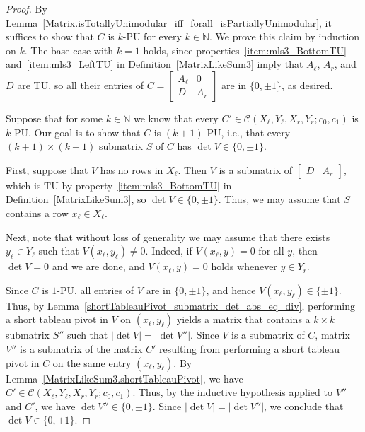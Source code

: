\begin{proof}
    \leanok
    By Lemma~\ref{Matrix.isTotallyUnimodular_iff_forall_isPartiallyUnimodular}, it suffices to show that $C$ is $k$-PU for every $k \in \mathbb{N}$. We prove this claim by induction on $k$. The base case with $k = 1$ holds, since properties~\ref{item:mls3_BottomTU} and~\ref{item:mls3_LeftTU} in Definition~\ref{MatrixLikeSum3} imply that $A_{\ell}$, $A_{r}$, and $D$ are TU, so all their entries of $C = \begin{bmatrix} A_{\ell} & 0 \\ D & A_{r} \end{bmatrix}$ are in $\{0, \pm 1\}$, as desired.

    Suppose that for some $k \in \mathbb{N}$ we know that every $C' \in \mathcal{C} (X_{\ell}, Y_{\ell}, X_{r}, Y_{r}; c_{0}, c_{1})$ is $k$-PU. Our goal is to show that $C$ is $(k + 1)$-PU, i.e., that every $(k + 1) \times (k + 1)$ submatrix $S$ of $C$ has $\det V \in \{0, \pm 1\}$.

    First, suppose that $V$ has no rows in $X_{\ell}$. Then $V$ is a submatrix of $\begin{bmatrix} D & A_{r} \end{bmatrix}$, which is TU by property~\ref{item:mls3_BottomTU} in Definition~\ref{MatrixLikeSum3}, so $\det V \in \{0, \pm 1\}$. Thus, we may assume that $S$ contains a row $x_{\ell} \in X_{\ell}$.

    Next, note that without loss of generality we may assume that there exists $y_{\ell} \in Y_{\ell}$ such that $V (x_{\ell}, y_{\ell}) \neq 0$. Indeed, if $V (x_{\ell}, y) = 0$ for all $y$, then $\det V = 0$ and we are done, and $V (x_{\ell}, y) = 0$ holds whenever $y \in Y_{r}$.

    Since $C$ is $1$-PU, all entries of $V$ are in $\{0, \pm 1\}$, and hence $V (x_{\ell}, y_{\ell}) \in \{\pm 1\}$. Thus, by Lemma~\ref{shortTableauPivot_submatrix_det_abs_eq_div}, performing a short tableau pivot in $V$ on $(x_{\ell}, y_{\ell})$ yields a matrix that contains a $k \times k$ submatrix $S''$ such that $|\det V| = |\det V''|$. Since $V$ is a submatrix of $C$, matrix $V''$ is a submatrix of the matrix $C'$ resulting from performing a short tableau pivot in $C$ on the same entry $(x_{\ell}, y_{\ell})$. By Lemma~\ref{MatrixLikeSum3.shortTableauPivot}, we have $C' \in \mathcal{C} (X_{\ell}, Y_{\ell}, X_{r}, Y_{r}; c_{0}, c_{1})$. Thus, by the inductive hypothesis applied to $V''$ and $C'$, we have $\det V'' \in \{0, \pm 1\}$. Since $|\det V| = |\det V''|$, we conclude that $\det V \in \{0, \pm 1\}$.
\end{proof}

